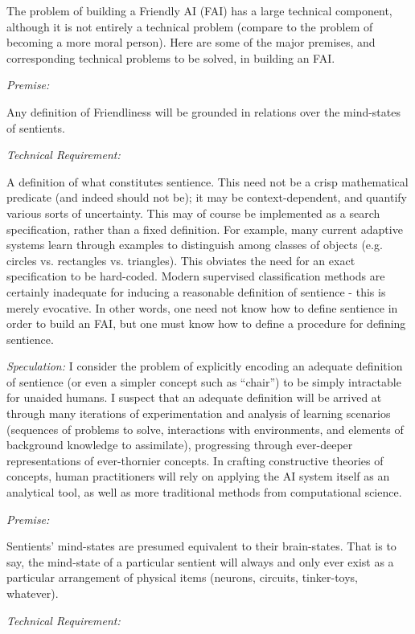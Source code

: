 \documentclass[twoside,11pt]{article}
\begin{document}
The problem of building a Friendly AI (FAI) has a large technical component,
although it is not entirely a technical problem (compare to the problem of
becoming a more moral person). Here are some of the major premises, and
corresponding technical problems to be solved, in building an FAI.
 
\emph{Premise:}

Any definition of Friendliness will be grounded in relations over the
mind-states of sentients.
 
\emph{Technical Requirement:}

A definition of what constitutes sentience. This need not be a crisp
mathematical predicate (and indeed should not be); it may be context-dependent,
and quantify various sorts of uncertainty. This may of course be implemented as
a search specification, rather than a fixed definition. For example, many
current adaptive systems learn through examples to distinguish among classes of
objects (e.g. circles vs. rectangles vs. triangles). This obviates the need for
an exact specification to be hard-coded. Modern supervised classification
methods are certainly inadequate for inducing a reasonable definition of
sentience - this is merely evocative. In other words, one need not know how to
define sentience in order to build an FAI, but one must know how to define a
procedure for defining sentience.
 
\emph{Speculation:} I consider the problem of explicitly encoding an adequate
definition of sentience (or even a simpler concept such as ``chair'') to be
simply intractable for unaided humans. I suspect that an adequate definition
will be arrived at through many iterations of experimentation and analysis of
learning scenarios (sequences of problems to solve, interactions with
environments, and elements of background knowledge to assimilate), progressing
through ever-deeper representations of ever-thornier concepts. In crafting
constructive theories of concepts, human practitioners will rely on applying
the AI system itself as an analytical tool, as well as more traditional methods
from computational science.

\emph{Premise:}

Sentients' mind-states are presumed equivalent to their brain-states. That is
to say, the mind-state of a particular sentient will always and only ever exist
as a particular arrangement of physical items (neurons, circuits, tinker-toys,
whatever).
 
\emph{Technical Requirement:}
\end{document}
